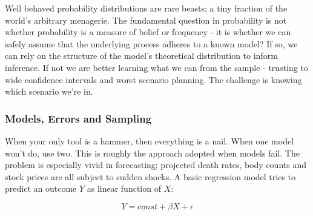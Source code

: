 \documentclass[10pt,a4paper,notitlepage, twocolumn]{article}
\begin{document}
Well behaved probability distributions are rare beasts; a tiny fraction of the world's arbitrary menagerie. The fundamental question in probability is not whether probability is a measure of belief or frequency - it is whether we can safely assume that the underlying process adheres to a known model? If so, we can rely on the structure of the model's theoretical distribution to inform inference. If not we are better learning what we can from the sample - trusting to wide confidence intervals and worst scenario planning. The challenge is knowing which scenario we're in.

\subsubsection*{Models, Errors and Sampling}
When your only tool is a hammer, then everything is a nail. When one model won't do, use two. This is roughly the approach adopted when models fail. The problem is especially vivid in forecasting; projected death rates, body counts and stock prices are all subject to sudden shocks. A basic regression model tries to predict an outcome $Y$ as linear function of $X$:

$$ Y = const + \beta X + \epsilon $$
\end{document}
